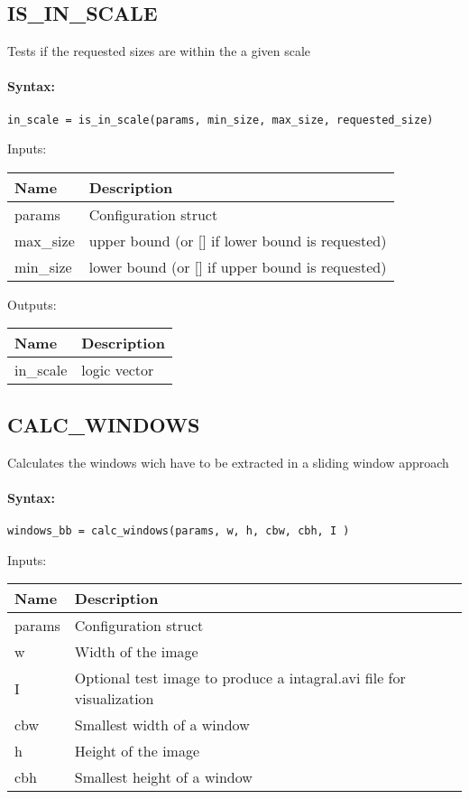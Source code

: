 \subsection{IS\_IN\_SCALE}

Tests if the requested sizes are within the a given scale

\paragraph{Syntax:} \verb|in_scale = is_in_scale(params, min_size, max_size, requested_size)|

\bigskip
Inputs:

\begin{tabular}{|p{}|p{}|}
\hline
\textbf{Name} & \textbf{Description} \\
\hline \hline
params & Configuration struct  \\ \hline
max\_size & upper bound (or [] if lower bound is requested)  \\ \hline
min\_size & lower bound (or [] if upper bound is requested)  \\ \hline
\end{tabular}

\bigskip
Outputs:

\begin{tabular}{|p{}|p{}|}
\hline
\textbf{Name} & \textbf{Description} \\
\hline \hline
in\_scale & logic vector  \\ \hline
\end{tabular}

\subsection{CALC\_WINDOWS}

Calculates the windows wich have to be extracted in a sliding window approach

\paragraph{Syntax:} \verb|windows_bb = calc_windows(params, w, h, cbw, cbh, I )|

\bigskip
Inputs:

\begin{tabular}{|p{}|p{}|}
\hline
\textbf{Name} & \textbf{Description} \\
\hline \hline
params & Configuration struct  \\ \hline
w & Width of the image  \\ \hline
I & Optional test image to produce a intagral.avi file for visualization  \\ \hline
cbw & Smallest width of a window  \\ \hline
h & Height of the image  \\ \hline
cbh & Smallest height of a window  \\ \hline
\end{tabular}

